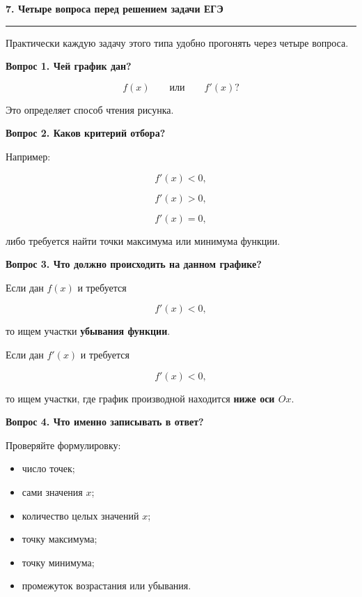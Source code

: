 \documentclass[a4paper,12pt]{article}
\newcommand{\maintitle}[1]{%
    {\Large\bfseries\color{darkaccent}#1\par}
    \vspace{2mm}
    {\color{accent}\rule{\linewidth}{0.6pt}}
    \vspace{4mm}
}
\newcommand{\subhead}[1]{%
    \vspace{3mm}
    {\large\bfseries\color{darkaccent}#1\par}
    \vspace{1mm}
}
\begin{document}
\begin{center}
\end{center}

\clearpage

\maintitle{7. Четыре вопроса перед решением задачи ЕГЭ}

Практически каждую задачу этого типа удобно прогонять через четыре
вопроса.

\subhead{Вопрос 1. Чей график дан?}

\[
f(x)
\qquad\text{или}\qquad
f'(x)?
\]

Это определяет способ чтения рисунка.

\subhead{Вопрос 2. Каков критерий отбора?}

Например:

\[
f'(x)<0,
\]

\[
f'(x)>0,
\]

\[
f'(x)=0,
\]

либо требуется найти точки максимума или минимума функции.

\subhead{Вопрос 3. Что должно происходить на данном графике?}

Если дан \(f(x)\) и требуется

\[
f'(x)<0,
\]

то ищем участки \textbf{убывания функции}.

Если дан \(f'(x)\) и требуется

\[
f'(x)<0,
\]

то ищем участки, где график производной находится
\textbf{ниже оси \(Ox\)}.

\subhead{Вопрос 4. Что именно записывать в ответ?}

Проверяйте формулировку:

\begin{itemize}
    \item число точек;
    \item сами значения \(x\);
    \item количество целых значений \(x\);
    \item точку максимума;
    \item точку минимума;
    \item промежуток возрастания или убывания.
\end{itemize}
\end{document}
